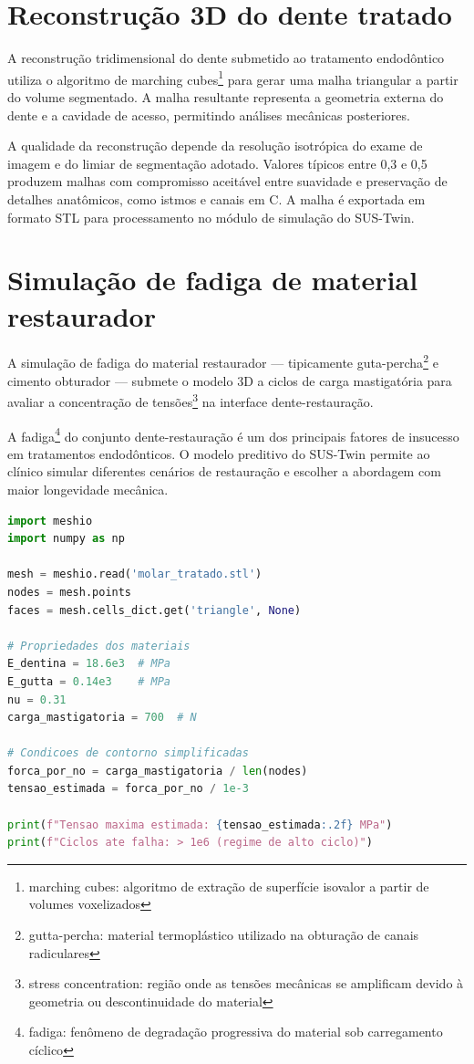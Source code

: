 \section{Reconstrução 3D do dente tratado}

A reconstrução tridimensional do dente submetido ao tratamento endodôntico utiliza o algoritmo de marching cubes{\footnote{marching cubes: algoritmo de extração de superfície isovalor a partir de volumes voxelizados}} para gerar uma malha triangular a partir do volume segmentado. A malha resultante representa a geometria externa do dente e a cavidade de acesso, permitindo análises mecânicas posteriores.

A qualidade da reconstrução depende da resolução isotrópica do exame de imagem e do limiar de segmentação adotado. Valores típicos entre 0,3 e 0,5 produzem malhas com compromisso aceitável entre suavidade e preservação de detalhes anatômicos, como istmos e canais em C. A malha é exportada em formato STL para processamento no módulo de simulação do SUS-Twin.

\section{Simulação de fadiga de material restaurador}

A simulação de fadiga do material restaurador --- tipicamente guta-percha{\footnote{gutta-percha: material termoplástico utilizado na obturação de canais radiculares}} e cimento obturador --- submete o modelo 3D a ciclos de carga mastigatória para avaliar a concentração de tensões{\footnote{stress concentration: região onde as tensões mecânicas se amplificam devido à geometria ou descontinuidade do material}} na interface dente-restauração.

A fadiga{\footnote{fadiga: fenômeno de degradação progressiva do material sob carregamento cíclico}} do conjunto dente-restauração é um dos principais fatores de insucesso em tratamentos endodônticos. O modelo preditivo do SUS-Twin permite ao clínico simular diferentes cenários de restauração e escolher a abordagem com maior longevidade mecânica.

\begin{lstlisting}[language=Python,caption={Simulação de carregamento cíclico para análise de fadiga}]
import meshio
import numpy as np

mesh = meshio.read('molar_tratado.stl')
nodes = mesh.points
faces = mesh.cells_dict.get('triangle', None)

# Propriedades dos materiais
E_dentina = 18.6e3  # MPa
E_gutta = 0.14e3    # MPa
nu = 0.31
carga_mastigatoria = 700  # N

# Condicoes de contorno simplificadas
forca_por_no = carga_mastigatoria / len(nodes)
tensao_estimada = forca_por_no / 1e-3

print(f"Tensao maxima estimada: {tensao_estimada:.2f} MPa")
print(f"Ciclos ate falha: > 1e6 (regime de alto ciclo)")
\end{lstlisting}

